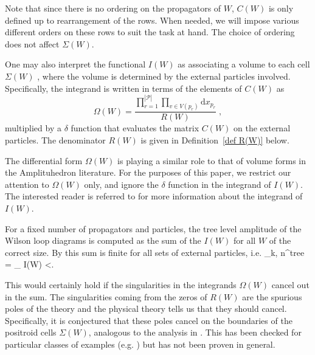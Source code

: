 \documentclass[11pt]{article}
\def\bas #1\eas{\begin{align*} #1 \end{align*}}
\newcommand{\cP}{\mathcal{P}}
\theoremstyle{remark}
\theoremstyle{definition}
\begin{document}
Note that since there is no ordering on the propagators of $W$, $C(W)$ is only defined up to rearrangement of the rows. When needed, we will impose various different orders on these rows to suit the task at hand. The choice of ordering does not affect $\Sigma(W)$.

One may also interpret the functional $I(W)$ as associating a volume to each cell $\Sigma(W)$ \cite{wilsonloop, Amplituhedronsquared, HeslopStewart}, where the volume is determined by the external particles involved. Specifically, the integrand is written in terms of the elements of $C(W)$ as  \begin{equation} \label{eq:omega(W) def}\Omega(W) = \frac{\prod_{r=1}^{|\cP|} \prod_{v \in V(p_r)} \textrm{d}x_{p_r}}{R(W)} \;, \end{equation} multiplied by a $\delta$ function that evaluates the matrix $C(W)$ on the external particles. The denominator $R(W)$ is given in Definition~\ref{def R(W)} below.

The differential form $\Omega(W)$ is playing a similar role to that of volume forms in the Amplituhedron literature.
For the purposes of this paper, we restrict our attention to $\Omega(W)$ only, and ignore the $\delta$ function in the integrand of $I(W)$. The interested reader is referred to \cite{Adamo:2012xe,HeslopStewart,LipsteinMason} for more information about the integrand of $I(W)$. 

For a fixed number of propagators and particles, the tree level amplitude of the Wilson loop diagrams is computed as the sum of the $I(W)$ for all $W$ of the correct size. By {\cite{Adamo:2011pv,Britto:2005fq,Arkani-Hamed:2013jha}} this sum is finite for all sets of external particles, i.e.
\bas \mathcal{A}_{k, n}^{tree} = \sum_{\substack{W = (\cP, [n]), \\ |\cP| = k}} I(W) <\infty. \eas

This would certainly hold if the singularities in the integrands $\Omega(W)$ cancel out in the sum.  The singularities coming from the zeros of $R(W)$ are the spurious poles of the theory and the physical theory tells us that they should cancel. 
Specifically, it is conjectured that these poles cancel on the boundaries of the positroid cells $\Sigma(W)$, analogous to the analysis in \cite{Arkani-Hamed:2013jha}. This has been checked for particular classes of examples (e.g. \cite{casestudy, Amplituhedronsquared, HeslopStewart}) but has not been proven in general.
\end{document}
